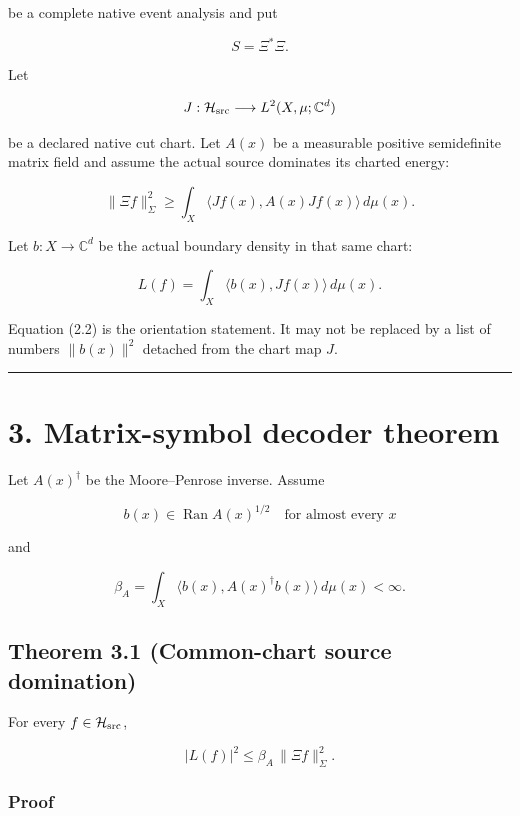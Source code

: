 be a complete native event analysis and put

\[
S=\Xi^*\Xi.
\]

Let

\[
J:\mathcal H_{\rm src}\longrightarrow
L^2(X,\mu;\mathbb C^d)
\]

be a declared native cut chart. Let \(A(x)\) be a measurable positive
semidefinite matrix field and assume the actual source dominates its charted
energy:

\[
\boxed{
\|\Xi f\|_{\Sigma}^2
\ge
\int_X
\langle Jf(x),A(x)Jf(x)\rangle\,d\mu(x).
}
\tag{2.1}
\]

Let \(b:X\to\mathbb C^d\) be the actual boundary density in that same chart:

\[
\boxed{
L(f)
=
\int_X
\langle b(x),Jf(x)\rangle\,d\mu(x).
}
\tag{2.2}
\]

Equation (2.2) is the orientation statement. It may not be replaced by a list
of numbers \(\|b(x)\|^2\) detached from the chart map \(J\).

\begin{center}\rule{0.5\linewidth}{0.5pt}\end{center}

\hypertarget{matrix-symbol-decoder-theorem}{%
\section{3. Matrix-symbol decoder theorem}\label{matrix-symbol-decoder-theorem}}

Let \(A(x)^\dagger\) be the Moore--Penrose inverse. Assume

\[
b(x)\in\operatorname{Ran}A(x)^{1/2}
\quad\text{for almost every }x
\]

and

\[
\boxed{
\beta_A
=
\int_X
\langle b(x),A(x)^\dagger b(x)\rangle\,d\mu(x)
<\infty.
}
\tag{3.1}
\]

\hypertarget{theorem-3.1-common-chart-source-domination}{%
\subsection{Theorem 3.1 (Common-chart source domination)}\label{theorem-3.1-common-chart-source-domination}}

For every \(f\in\mathcal H_{\rm src}\),

\[
\boxed{
|L(f)|^2
\le
\beta_A\,\|\Xi f\|_\Sigma^2.
}
\tag{3.2}
\]

\hypertarget{proof}{%
\subsubsection{Proof}\label{proof}}

